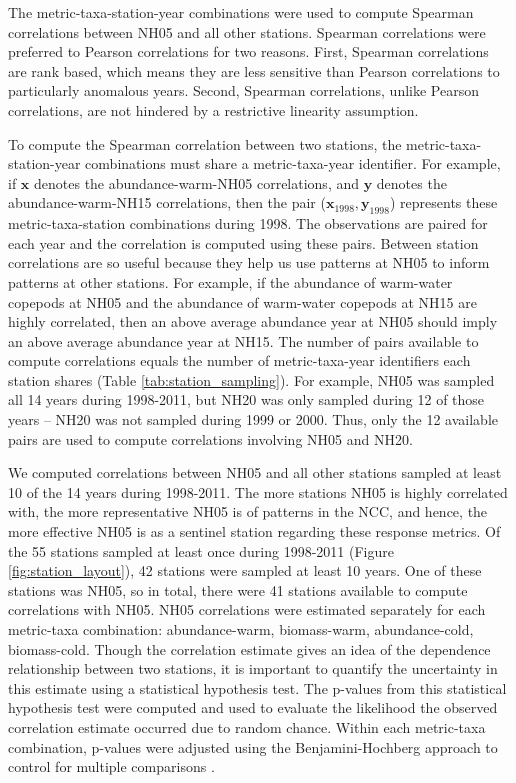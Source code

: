 \documentclass[preprint, authoryear, 12pt]{elsarticle}
\begin{document}
The metric-taxa-station-year combinations were used to compute Spearman correlations between NH05 and all other stations. Spearman correlations were preferred to Pearson correlations for two reasons. First, Spearman correlations are rank based, which means they are less sensitive than Pearson correlations to particularly anomalous years. Second, Spearman correlations, unlike Pearson correlations, are not hindered by a restrictive linearity assumption.

To compute the Spearman correlation between two stations, the metric-taxa-station-year combinations must share a metric-taxa-year identifier. For example, if $\mathbf{x}$ denotes the abundance-warm-NH05 correlations, and $\mathbf{y}$ denotes the abundance-warm-NH15 correlations, then the pair ($\mathbf{x}_{1998}, \mathbf{y}_{1998}$) represents these metric-taxa-station combinations during 1998. The observations are paired for each year and the correlation is computed using these pairs. Between station correlations are so useful because they help us use patterns at NH05 to inform patterns at other stations. For example, if the abundance of warm-water copepods at NH05 and the abundance of warm-water copepods at NH15 are highly correlated, then an above average abundance year at NH05 should imply an above average abundance year at NH15.  The number of pairs available to compute correlations equals the number of metric-taxa-year identifiers each station shares (Table \ref{tab:station_sampling}). For example, NH05 was sampled all 14 years during 1998-2011, but NH20 was only sampled during 12 of those years -- NH20 was not sampled during 1999 or 2000. Thus, only the 12 available pairs are used to compute correlations involving NH05 and NH20.

We computed correlations between NH05 and all other stations sampled at least 10 of the 14 years during 1998-2011. The more stations NH05 is highly correlated with, the more representative NH05 is of patterns in the NCC, and hence, the more effective NH05 is as a sentinel station regarding these response metrics. Of the 55 stations sampled at least once during 1998-2011 (Figure \ref{fig:station_layout}), 42 stations were sampled at least 10 years. One of these stations was NH05, so in total, there were 41 stations available to compute correlations with NH05. NH05 correlations were estimated separately for each metric-taxa combination: abundance-warm, biomass-warm, abundance-cold, biomass-cold. Though the correlation estimate gives an idea of the dependence relationship between two stations, it is important to quantify the uncertainty in this estimate using a statistical hypothesis test. The p-values from this statistical hypothesis test were computed and used to evaluate the likelihood the observed correlation estimate occurred due to random chance.  Within each metric-taxa combination, p-values were adjusted using the Benjamini-Hochberg approach to control for multiple comparisons \citep{benjamini1995controlling}.
\end{document}
